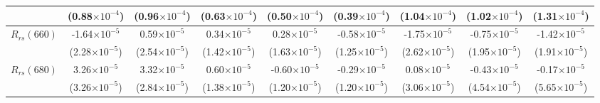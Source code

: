 \documentclass[preview]{standalone}
\begin{document}
\begin{tabular}{ccccccccc}
	& (0.88$\times10^{-4}$) & (0.96$\times10^{-4}$) & (0.63$\times10^{-4}$) & (0.50$\times10^{-4}$) & (0.39$\times10^{-4}$) & (1.04$\times10^{-4}$) & (1.02$\times10^{-4}$) & (1.31$\times10^{-4}$) \\ \hline
$R_{rs}(660)$ 	& -1.64$\times10^{-5}$ &    0.59$\times10^{-5}$ &    0.34$\times10^{-5}$ &    0.28$\times10^{-5}$ &   -0.58$\times10^{-5}$ &   -1.75$\times10^{-5}$ &   -0.75$\times10^{-5}$ &   -1.42$\times10^{-5}$ \\
	& (2.28$\times10^{-5}$) & (2.54$\times10^{-5}$) & (1.42$\times10^{-5}$) & (1.63$\times10^{-5}$) & (1.25$\times10^{-5}$) & (2.62$\times10^{-5}$) & (1.95$\times10^{-5}$) & (1.91$\times10^{-5}$) \\ \hline
$R_{rs}(680)$ 	&  3.26$\times10^{-5}$ &    3.32$\times10^{-5}$ &    0.60$\times10^{-5}$ &   -0.60$\times10^{-5}$ &   -0.29$\times10^{-5}$ &    0.08$\times10^{-5}$ &   -0.43$\times10^{-5}$ &   -0.17$\times10^{-5}$ \\
	& (3.26$\times10^{-5}$) & (2.84$\times10^{-5}$) & (1.38$\times10^{-5}$) & (1.20$\times10^{-5}$) & (1.20$\times10^{-5}$) & (3.06$\times10^{-5}$) & (4.54$\times10^{-5}$) & (5.65$\times10^{-5}$) \\ \hline
 \end{tabular}
\end{document}
